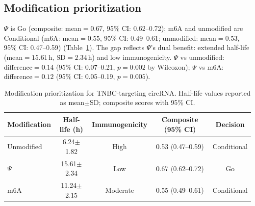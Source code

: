 \subsection*{Modification prioritization}
$\Psi$ is Go (composite: mean${=}0.67$, 95\% CI: 0.62--0.72); m6A and unmodified are Conditional (m6A: mean${=}0.55$, 95\% CI: 0.49--0.61; unmodified: mean${=}0.53$, 95\% CI: 0.47--0.59) (Table~\ref{tab:casestudy}). The gap reflects $\Psi$'s dual benefit: extended half-life (mean${=}15.61\,$h, SD${=}2.34\,$h) and low immunogenicity. $\Psi$ vs unmodified: difference${=}0.14$ (95\% CI: 0.07--0.21, $p{=}0.002$ by Wilcoxon); $\Psi$ vs m6A: difference${=}0.12$ (95\% CI: 0.05--0.19, $p{=}0.005$).

\begin{table}[t]
\centering
\caption{Modification prioritization for TNBC-targeting circRNA. Half-life values reported as mean$\pm$SD; composite scores with 95\% CI.}
\label{tab:casestudy}
\begin{tabular}{lcccc}
\toprule
\textbf{Modification} & \textbf{Half-life (h)} & \textbf{Immunogenicity} & \textbf{Composite (95\% CI)} & \textbf{Decision} \\
\midrule
Unmodified & 6.24$\pm$1.82 & High & 0.53 (0.47--0.59) & Conditional \\
$\Psi$ & 15.61$\pm$2.34 & Low & 0.67 (0.62--0.72) & Go \\
m6A & 11.24$\pm$2.15 & Moderate & 0.55 (0.49--0.61) & Conditional \\
\bottomrule
\end{tabular}
\end{table}
